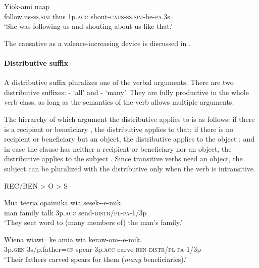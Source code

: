 \ea%
\label{ex:3:x489}
\gll Yiok-ami naap   \\
follow.us-\textsc{ss}.\textsc{sim} thus 1p.\textsc{acc} shout-\textsc{caus}-\textsc{ss}.\textsc{sim}-be-\textsc{pa}.3s\\
\glt`She was following us and shouting about us like that.'
\z

The causative as a valence-increasing device is discussed in . 

\paragraph{Distributive suffix}\label{sec:3.8.2.3.2}
{}
A distributive suffix pluralizes one of the verbal arguments. There are two distributive suffixes: \nobreakdash- `all' and \nobreakdash- `many'. They are fully productive in the whole verb class, as long as the semantics of the verb allows multiple arguments. 

The hierarchy of which argument the distributive applies to is as follows: if there is a recipient  or beneficiary , the distributive applies to that; if there is no recipient or beneficiary but an object, the distributive applies to the object ; and in case the clause has neither a recipient or beneficiary nor an object, the distributive applies to the subject . Since transitive verbs need an object, the subject can be pluralized with the distributive only when the verb is intransitive.

\ea
\textsc{REC/BEN {{\textgreater}} O {{\textgreater}} S}
\z

\ea%
\label{ex:3:x209}
\gll Mua teeria opaimika wia sesek--e-mik. \\
man family talk 3p.\textsc{acc} send-\textsc{distr}/\textsc{pl}-\textsc{pa}-1/3p \\
\glt`They sent word to (many members of) the man's family.'
\z

\ea%
\label{ex:3:x429}
\gll Wiena wiawi=ke amia wia keraw-om--e-mik. \\
3p.\textsc{gen} 3s/p.father=\textsc{cf} spear 3p.\textsc{acc} carve-\textsc{ben}-\textsc{distr}/\textsc{pl}-\textsc{pa}-1/3p\\
\glt`Their fathers carved spears for them (\textit{many} beneficiaries).'
\z


